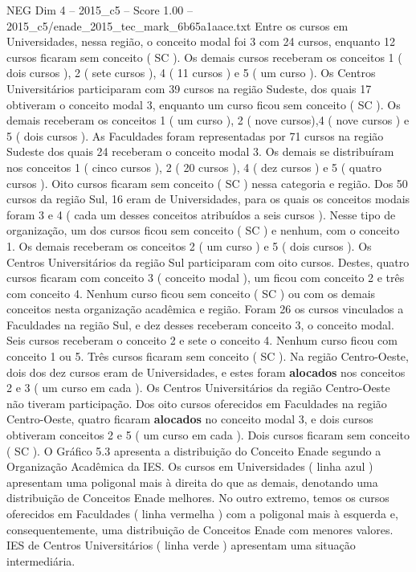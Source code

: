 \begin{textsample}{NEG Dim 4 – 2015\_c5 – Score 1.00 – 2015\_c5/enade\_2015\_tec\_mark\_6b65a1aace.txt}
Entre os cursos em Universidades, nessa região, o conceito modal foi 3 com 24 cursos, enquanto 12 cursos ficaram sem conceito ( SC ).
Os demais cursos receberam os conceitos 1 ( dois cursos ), 2 ( sete cursos ), 4 ( 11 cursos ) e 5 ( um curso ).
Os Centros Universitários participaram com 39 cursos na região Sudeste, dos quais 17 obtiveram o conceito modal 3, enquanto um curso ficou sem conceito ( SC ).
Os demais receberam os conceitos 1 ( um curso ), 2 ( nove cursos),4 ( nove cursos ) e 5 ( dois cursos ).
As Faculdades foram representadas por 71 cursos na região Sudeste dos quais 24 receberam o conceito modal 3.
Os demais se distribuíram nos conceitos 1 ( cinco cursos ), 2 ( 20 cursos ), 4 ( dez cursos ) e 5 ( quatro cursos ).
Oito cursos ficaram sem conceito ( SC ) nessa categoria e região.
Dos 50 cursos da região Sul, 16 eram de Universidades, para os quais os conceitos modais foram 3 e 4 ( cada um desses conceitos atribuídos a seis cursos ).
Nesse tipo de organização, um dos cursos ficou sem conceito ( SC ) e nenhum, com o conceito 1.
Os demais receberam os conceitos 2 ( um curso ) e 5 ( dois cursos ).
Os Centros Universitários da região Sul participaram com oito cursos.
Destes, quatro cursos ficaram com conceito 3 ( conceito modal ), um ficou com conceito 2 e três com conceito 4.
Nenhum curso ficou sem conceito ( SC ) ou com os demais conceitos nesta organização acadêmica e região.
Foram 26 os cursos vinculados a Faculdades na região Sul, e dez desses receberam conceito 3, o conceito modal.
Seis cursos receberam o conceito 2 e sete o conceito 4.
Nenhum curso ficou com conceito 1 ou 5.
Três cursos ficaram sem conceito ( SC ).
Na região Centro-Oeste, dois dos dez cursos eram de Universidades, e estes foram \textbf{alocados} nos conceitos 2 e 3 ( um curso em cada ).
Os Centros Universitários da região Centro-Oeste não tiveram participação.
Dos oito cursos oferecidos em Faculdades na região Centro-Oeste, quatro ficaram \textbf{alocados} no conceito modal 3, e dois cursos obtiveram conceitos 2 e 5 ( um curso em cada ).
Dois cursos ficaram sem conceito ( SC ).
O Gráfico 5.3 apresenta a distribuição do Conceito Enade segundo a Organização Acadêmica da IES.
Os cursos em Universidades ( linha azul ) apresentam uma poligonal mais à direita do que as demais, denotando uma distribuição de Conceitos Enade melhores.
No outro extremo, temos os cursos oferecidos em Faculdades ( linha vermelha ) com a poligonal mais à esquerda e, consequentemente, uma distribuição de Conceitos Enade com menores valores.
IES de Centros Universitários ( linha verde ) apresentam uma situação intermediária.

\end{textsample}
